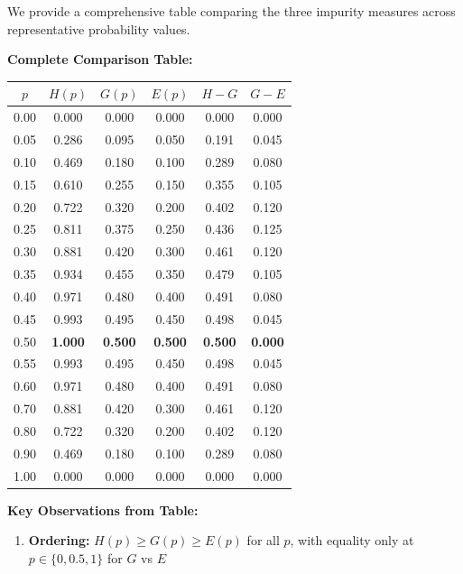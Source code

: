 \documentclass[12pt]{article}
\begin{document}
\begin{solution}
We provide a comprehensive table comparing the three impurity measures across representative probability values.

\textbf{Complete Comparison Table:}

\begin{center}
\begin{tabular}{|c|c|c|c|c|c|}
\hline
\textbf{$p$} & \textbf{$H(p)$} & \textbf{$G(p)$} & \textbf{$E(p)$} & \textbf{$H-G$} & \textbf{$G-E$} \\
\hline
0.00 & 0.000 & 0.000 & 0.000 & 0.000 & 0.000 \\
0.05 & 0.286 & 0.095 & 0.050 & 0.191 & 0.045 \\
0.10 & 0.469 & 0.180 & 0.100 & 0.289 & 0.080 \\
0.15 & 0.610 & 0.255 & 0.150 & 0.355 & 0.105 \\
0.20 & 0.722 & 0.320 & 0.200 & 0.402 & 0.120 \\
0.25 & 0.811 & 0.375 & 0.250 & 0.436 & 0.125 \\
0.30 & 0.881 & 0.420 & 0.300 & 0.461 & 0.120 \\
0.35 & 0.934 & 0.455 & 0.350 & 0.479 & 0.105 \\
0.40 & 0.971 & 0.480 & 0.400 & 0.491 & 0.080 \\
0.45 & 0.993 & 0.495 & 0.450 & 0.498 & 0.045 \\
0.50 & \textbf{1.000} & \textbf{0.500} & \textbf{0.500} & \textbf{0.500} & \textbf{0.000} \\
0.55 & 0.993 & 0.495 & 0.450 & 0.498 & 0.045 \\
0.60 & 0.971 & 0.480 & 0.400 & 0.491 & 0.080 \\
0.70 & 0.881 & 0.420 & 0.300 & 0.461 & 0.120 \\
0.80 & 0.722 & 0.320 & 0.200 & 0.402 & 0.120 \\
0.90 & 0.469 & 0.180 & 0.100 & 0.289 & 0.080 \\
1.00 & 0.000 & 0.000 & 0.000 & 0.000 & 0.000 \\
\hline
\end{tabular}
\end{center}

\textbf{Key Observations from Table:}

\begin{enumerate}
\item \textbf{Ordering:} $H(p) \geq G(p) \geq E(p)$ for all $p$, with equality only at $p \in \{0, 0.5, 1\}$ for $G$ vs $E$


\end{enumerate}
\end{solution}
\end{document}
